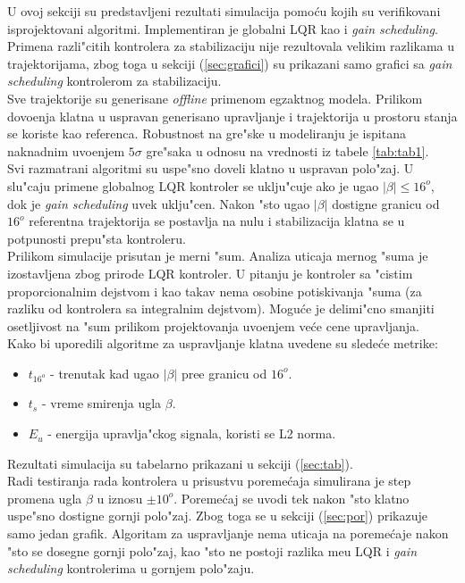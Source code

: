 \documentclass[a4paper,11pt]{article}
\theoremstyle{definition} \newtheorem{deff}{Definicija}[section]
\theoremstyle{definition} \newtheorem{prim}[deff]{Primer}
\theoremstyle{plain} \newtheorem{teor}[deff]{Teorema}
\begin{document}
	U ovoj sekciji su predstavljeni rezultati simulacija pomo\'cu kojih su verifikovani isprojektovani algoritmi. Implementiran je globalni LQR kao i \emph{gain scheduling}. Primena razli"citih kontrolera za stabilizaciju nije rezultovala velikim razlikama u trajektorijama, zbog toga u sekciji (\ref{sec:grafici}) su prikazani samo grafici sa \emph{gain scheduling} kontrolerom za stabilizaciju. \\ 
	
	Sve trajektorije su generisane \emph{offline} primenom egzaktnog modela. Prilikom dovo\dj enja klatna u uspravan generisano upravljanje i trajektorija u prostoru stanja se koriste kao referenca. Robustnost na gre"ske u modeliranju je ispitana naknadnim uvo\dj enjem $5\sigma$ gre"saka u odnosu na vrednosti iz tabele \ref{tab:tab1}.\\
	
	Svi razmatrani algoritmi su uspe"sno doveli klatno u uspravan polo"zaj. U slu"caju primene globalnog LQR kontroler se uklju"cuje ako je ugao $|\beta| \leq 16^o$, dok je \emph{gain scheduling} uvek uklju"cen. Nakon "sto ugao $|\beta|$ dostigne granicu od $16^o$ referentna trajektorija se postavlja na nulu i stabilizacija klatna se u potpunosti prepu"sta kontroleru.\\
	
	Prilikom simulacije prisutan je merni "sum. Analiza uticaja mernog "suma je izostavljena zbog prirode LQR kontroler. U pitanju je kontroler sa "cistim proporcionalnim dejstvom i kao takav nema osobine potiskivanja "suma (za razliku od kontrolera sa integralnim dejstvom). Mogu\'ce je delimi"cno smanjiti osetljivost na "sum prilikom projektovanja uvo\dj enjem ve\'ce cene upravljanja.\\
	
	Kako bi uporedili algoritme za uspravljanje klatna uvedene su slede\'ce metrike:
	\begin{itemize}
		\item $t_{16^o}$ - trenutak kad ugao $|\beta|$ pre\dj e granicu od $16^o$.
		\item $t_s$ - vreme smirenja ugla $\beta$.
		\item $E_u$ - energija upravlja"ckog signala, koristi se L2 norma.
	\end{itemize}
	Rezultati simulacija su tabelarno prikazani u sekciji (\ref{sec:tab}).\\
	
	Radi testiranja rada kontrolera u prisustvu poreme\'caja simulirana je step promena ugla $\beta$ u iznosu $\pm10^o$. Poreme\'caj se uvodi tek nakon "sto klatno uspe"sno dostigne gornji polo"zaj. Zbog toga se u sekciji (\ref{sec:por}) prikazuje samo jedan grafik. Algoritam za uspravljanje nema uticaja na poreme\'caje nakon "sto se dosegne gornji polo"zaj, kao "sto ne postoji razlika me\dj u LQR i \emph{gain scheduling} kontrolerima u gornjem polo"zaju.\\
	
\end{document}
